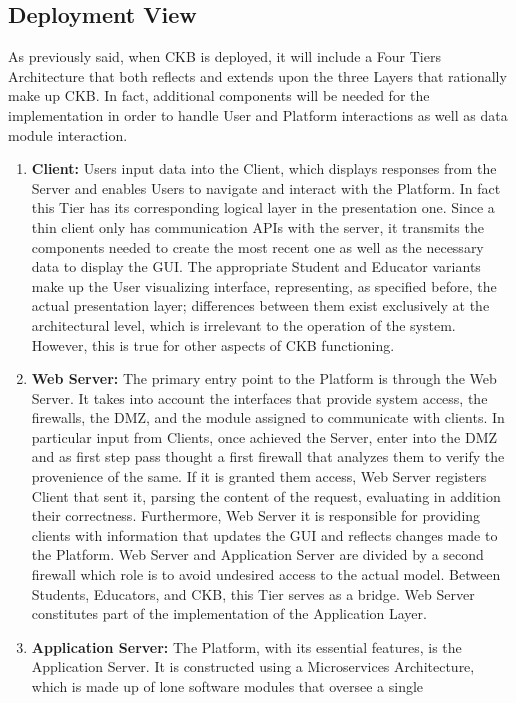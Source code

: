 \subsection{Deployment View}

As previously said, when CKB is deployed, it will include a Four Tiers Architecture that both reflects and extends upon the three Layers that rationally make up CKB.
In fact, additional components will be needed for the implementation in order to handle User and Platform interactions as well as data module interaction.
\begin{enumerate}[label=$\bullet$]
    \item \textbf{Client:} Users input data into the Client, which displays responses from the Server and enables Users to navigate and interact with the Platform. In fact this Tier has its corresponding logical layer in the presentation one. 
    Since a thin client only has communication APIs with the server, it transmits the components needed to create the most recent one as well as the necessary data to display the GUI.
    The appropriate Student and Educator variants make up the User visualizing interface, representing, as specified before, the actual presentation layer; differences between them exist exclusively at the architectural level, which is irrelevant to the operation of the system. However, this is true for other aspects of CKB functioning.
    \item \textbf{Web Server:} The primary entry point to the Platform is through the Web Server. It takes into account the interfaces that provide system access, the firewalls, the DMZ, and the module assigned to communicate with 
    clients. In particular input from Clients, once achieved the Server, enter into the DMZ and as first step pass thought a first firewall that analyzes them to verify the provenience of the same. If it is granted them access, Web Server registers Client that sent it, parsing the content of the request, evaluating in addition their correctness. 
    Furthermore, Web Server it is responsible for providing clients with information that updates the GUI and reflects changes made to the Platform. Web Server and Application Server are divided by a second firewall which role is to avoid undesired access to the actual model. Between Students, Educators, 
    and CKB, this Tier serves as a bridge. Web Server constitutes part of the implementation of the Application Layer.
    \item \textbf{Application Server:} The Platform, with its essential features, is the Application Server. It is constructed using a Microservices Architecture, which is made up of lone software modules that oversee a single 

\end{enumerate}
